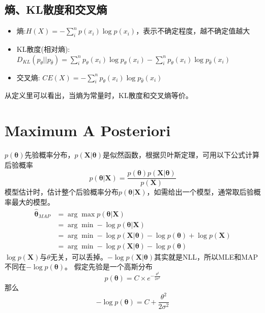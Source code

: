 \subsection{熵、KL散度和交叉熵}
\begin{itemize}
    \item 熵:$H(X)=-\sum_i^n p(x_i)\log p(x_i)$，表示不确定程度，越不确定值越大
    \item KL散度(相对熵): $D_{KL}(p_{\theta}||p_{\hat\theta}) = \sum_i^n p_{\theta}(x_i) \log {p_{\theta}(x_i)} - \sum_i^np_{\theta}(x_i) \log {p_{\hat\theta}(x_i)}$ 
    \item 交叉熵: $CE(X) = - \sum_i^np_{\theta}(x_i) \log {p_{\hat\theta}(x_i)}$
\end{itemize}
从定义里可以看出，当熵为常量时，KL散度和交叉熵等价。

\section{Maximum A Posteriori}
$p(\boldsymbol{\theta})$先验概率分布，$p(\mathbf{X}|\boldsymbol{\theta})$是似然函数，根据贝叶斯定理，可用以下公式计算后验概率
\begin{equation}
    p(\boldsymbol{\theta} | \mathbf{X}) = \frac{p(\boldsymbol{\theta})p(\mathbf{X}|\boldsymbol{\theta})}{p(\mathbf{X})}
\end{equation}
模型估计时，估计整个后验概率分布$p(\boldsymbol{\theta} | \mathbf{X})$，如需给出一个模型，通常取后验概率最大的模型。
\begin{equation}
    \begin{split}
        \hat{\boldsymbol{\theta}}_{MAP} &= \arg \max p(\boldsymbol{\theta} | \mathbf{X}) \\
        &= \arg \min -\log p(\boldsymbol{\theta} | \mathbf{X}) \\
        &= \arg \min -\log p(\mathbf{X}|\boldsymbol{\theta}) - \log p(\boldsymbol{\theta}) + \log p(\mathbf{X}) \\
        &= \arg \min -\log p(\mathbf{X}|\boldsymbol{\theta}) - \log p(\boldsymbol{\theta})
    \end{split}
\end{equation}
$\log p(\mathbf{X})$与$\theta$无关，可以丢掉。$-\log p(\mathbf{X}|\boldsymbol{\theta})$其实就是NLL，所以MLE和MAP不同在$- \log p(\boldsymbol{\theta})$。
假定先验是一个高斯分布
\begin{equation}
    p(\boldsymbol{\theta}) = C \times e^{-\frac{\theta^2}{2\sigma^2}}
\end{equation}
那么
\begin{equation}
    -\log p(\boldsymbol{\theta}) = C + \frac{\theta^2}{2\sigma^2}
\end{equation}

